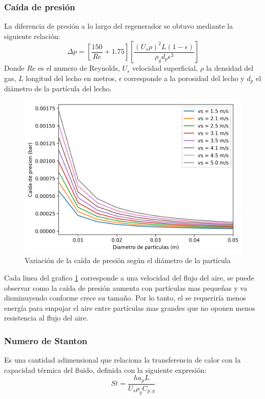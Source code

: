 \documentclass[12pt,letterpaper,final]{article}%
\begin{document}
\subsubsection{Caída de presión}
La diferencia de presión a lo largo del regenerador se obtuvo mediante la siguiente relación\cite{Valle-Guadarrama2015}:
\begin{equation}\label{Ecu_ergun}
	\Delta p = [ \frac{150}{Re} + 1.75 ] [ \frac{(U_s \rho)^2 L (1-\epsilon)}{\rho_g d_p \epsilon^3}  ]
\end{equation}
Donde $Re$ es el numero de Reynolds, $U_s$ velocidad superficial, $\rho$ la densidad del gas, $L$ longitud del lecho en metros, $\epsilon$ corresponde a la porosidad del lecho y $d_p$ el diámetro de la partícula del lecho.
\begin{figure}[ht!]
	\centering
	\includegraphics[scale=0.9]{dPrvsDp_03.png}
	\caption{Variación de la caída de presión según el diámetro de la partícula}
	\label{fig:CaidaP_por_dp}
\end{figure}
Cada linea del grafico \ref{fig:CaidaP_por_dp} corresponde a una velocidad del flujo del aire, se puede observar como la caída de presión aumenta con partículas mas pequeñas y va disminuyendo conforme crece su tamaño. Por lo tanto, el se requeriría menos energía para empujar el aire entre partículas mas grandes que no oponen menos resistencia al flujo del aire. 
\subsubsection{Numero de Stanton}
Es una cantidad adimensional que relaciona la transferencia de calor con la capacidad térmica del fluido, definida con la siguiente expresión:
\begin{equation}\label{Ecu_stanton}
	St = \frac{h a_p L}{U_s \rho_g C_{p,g}}
\end{equation}
\end{document}
